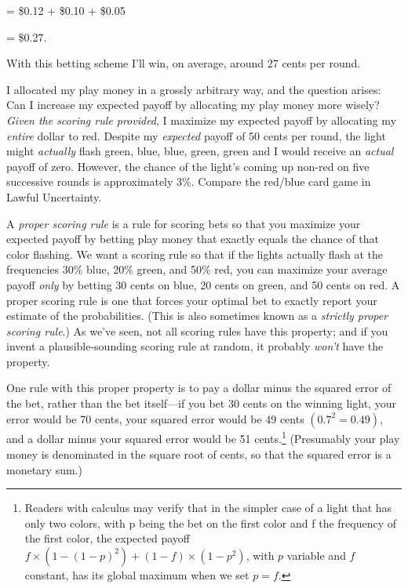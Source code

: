 \bigskip

{\centering
 = \$0.12 + \$0.10 + \$0.05
\par}


\bigskip

{\centering
 = \$0.27.
\par}


\bigskip

{
 With this betting scheme I'll win, on average,
around 27 cents per round.}

{
 I allocated my play money in a grossly arbitrary way, and the
question arises: Can I increase my expected payoff by allocating my
play money more wisely? \textit{Given the scoring rule provided}, I
maximize my expected payoff by allocating my \textit{entire} dollar to
red. Despite my \textit{expected} payoff of 50 cents per round, the
light might \textit{actually} flash green, blue, blue, green, green and
I would receive an \textit{actual} payoff of zero. However, the chance
of the light's coming up non-red on five successive
rounds is approximately 3\%. Compare the red/blue card game in Lawful
Uncertainty.}

{
 A \textit{proper scoring rule} is a rule for scoring bets so that
you maximize your expected payoff by betting play money that exactly
equals the chance of that color flashing. We want a scoring rule so
that if the lights actually flash at the frequencies 30\% blue, 20\%
green, and 50\% red, you can maximize your average payoff \textit{only}
by betting 30 cents on blue, 20 cents on green, and 50 cents on red. A
proper scoring rule is one that forces your optimal bet to exactly
report your estimate of the probabilities. (This is also sometimes
known as a \textit{strictly proper scoring rule}.) As
we've seen, not all scoring rules have this property;
and if you invent a plausible-sounding scoring rule at random, it
probably \textit{won't} have the property.}

{
 One rule with this proper property is to pay a dollar minus the
squared error of the bet, rather than the bet itself---if you bet 30
cents on the winning light, your error would be 70 cents, your squared
error would be 49 cents $(0.7^2 = 0.49)$, and a dollar
minus your squared error would be 51 cents.\footnote{Readers with calculus may verify that in the simpler case of a
light that has only two colors, with p being the bet on the first color
and f the frequency of the first color, the expected payoff $f
\times (1 - (1 - p)^2) + (1 - f) \times (1 - p^2)$, with $p$ variable and $f$ constant, has its global
maximum when we set $p = f$.}
(Presumably your play money is denominated in the square root of cents,
so that the squared error is a monetary sum.)}


